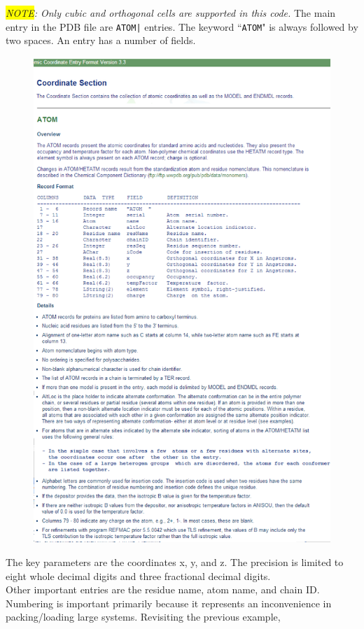 
\textit{\colorbox{yellow}{NOTE}: Only cubic and orthogonal cells are supported in this code.}
The main entry in the PDB file are \texttt{ATOM|} entries.  The keyword ``\texttt{ATOM}" is always followed by two spaces. An entry has a number of fields.
\begin{figure}[H]
\centering
\includegraphics[scale=1.0]{images/atom}
\end{figure}
The key parameters are the coordinates x, y, and z. The precision is limited to eight whole decimal digits and three fractional decimal digits.\\
Other important entries are the residue name, atom name, and chain ID. Numbering is important primarily because it represents an inconvenience in packing/loading large systems. Revisiting the previous example,\\\\

